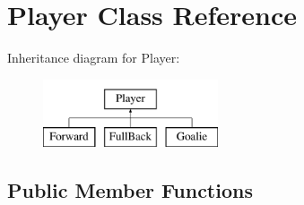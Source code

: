 \hypertarget{classPlayer}{
\section{Player Class Reference}
\label{classPlayer}
}
Inheritance diagram for Player:\begin{figure}[H]
\begin{center}
\leavevmode
\includegraphics[height=2.000000cm]{classPlayer}
\end{center}
\end{figure}
\subsection*{Public Member Functions}
